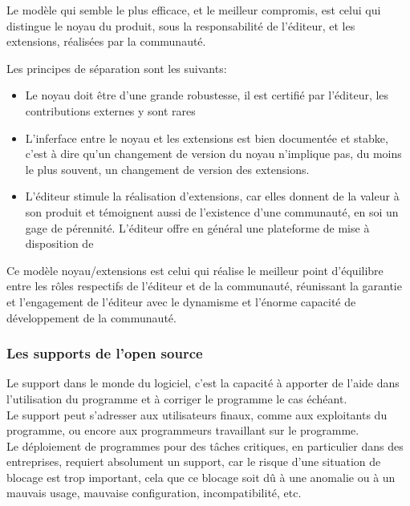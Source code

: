 				Le modèle qui semble le plus efficace, et le meilleur compromis, est celui qui distingue le noyau du produit, sous la responsabilité de l'éditeur, et les extensions, réalisées par la communauté.

				Les principes de séparation sont les suivants:

				\begin{itemize}[label=\textbullet, font=\LARGE \color{burntorange}]
					\item Le noyau doit être d'une grande robustesse, il est certifié par l'éditeur, les contributions externes y sont rares
					\item L'inferface entre le noyau et les extensions est bien documentée et stabke, c'est à dire qu'un changement de version du noyau n'implique pas, du moins le plus souvent, un changement de version des extensions.	
					\item L'éditeur stimule la réalisation d'extensions, car elles donnent de la valeur à son produit et témoignent aussi de l'existence d'une communauté, en soi un gage de pérennité. L'éditeur offre en général une plateforme de mise à disposition de 
				\end{itemize}

				Ce modèle noyau/extensions est celui qui réalise le meilleur point d'équilibre entre les rôles respectifs de l'éditeur et de la communauté, réunissant la garantie et l'engagement de l'éditeur avec le dynamisme et l'énorme capacité de développement de la communauté.

			\subsubsection{Les supports de l'open source}

				Le support dans le monde du logiciel, c'est la capacité à apporter de l'aide dans l'utilisation du programme et à corriger le programme le cas échéant.\\
				
				Le support peut s'adresser aux utilisateurs finaux, comme aux exploitants du programme, ou encore aux programmeurs travaillant sur le programme.\\
				
				Le déploiement de programmes pour des tâches critiques, en particulier dans des entreprises, requiert absolument un support, car le risque d'une situation de blocage est trop important, cela que ce blocage soit dû à une anomalie ou à un mauvais usage, mauvaise configuration, incompatibilité, etc.

